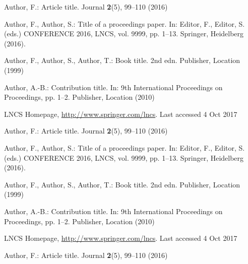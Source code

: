 \documentclass[runningheads]{llncs}
\begin{document}
%
%
%
% 
% 
%
\begin{thebibliography}{8}
Author, F.: Article title. Journal \textbf{2}(5), 99--110 (2016)

Author, F., Author, S.: Title of a proceedings paper. In: Editor,
F., Editor, S. (eds.) CONFERENCE 2016, LNCS, vol. 9999, pp. 1--13.
Springer, Heidelberg (2016). 

Author, F., Author, S., Author, T.: Book title. 2nd edn. Publisher,
Location (1999)

Author, A.-B.: Contribution title. In: 9th International Proceedings
on Proceedings, pp. 1--2. Publisher, Location (2010)

LNCS Homepage, \url{http://www.springer.com/lncs}. Last accessed 4
Oct 2017

Author, F.: Article title. Journal \textbf{2}(5), 99--110 (2016)

Author, F., Author, S.: Title of a proceedings paper. In: Editor,
F., Editor, S. (eds.) CONFERENCE 2016, LNCS, vol. 9999, pp. 1--13.
Springer, Heidelberg (2016). 

Author, F., Author, S., Author, T.: Book title. 2nd edn. Publisher,
Location (1999)

Author, A.-B.: Contribution title. In: 9th International Proceedings
on Proceedings, pp. 1--2. Publisher, Location (2010)

LNCS Homepage, \url{http://www.springer.com/lncs}. Last accessed 4
Oct 2017

Author, F.: Article title. Journal \textbf{2}(5), 99--110 (2016)


\end{thebibliography}
\end{document}
